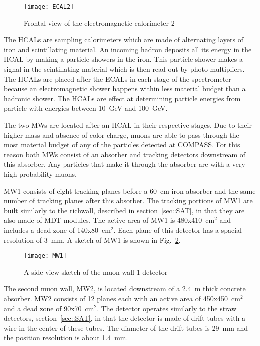 \begin{figure}[h!t]
  \centering
  \texttt{[image: ECAL2]}
  \caption{Frontal view of the electromagnetic calorimeter 2}
  \label{fig::ECAL2}
\end{figure}


The HCALs are sampling calorimeters which are made of alternating layers of iron
and scintillating material.  An incoming hadron deposits all its energy in the
HCAL by making a particle showers in the iron.  This particle shower makes a
signal in the scintillating material which is then read out by photo
multipliers.  The HCALs are placed after the ECALs in each stage of the
spectrometer because an electromagnetic shower happens within less material
budget than a hadronic shower.  The HCALs are effect at determining particle
energies from particle with energies between 10~GeV and 100~GeV. \par

The two MWs are located after an HCAL in their respective stages.  Due to their
higher mass and absence of color charge, muons are able to pass through the most
material budget of any of the particles detected at COMPASS.  For this reason
both MWs consist of an absorber and tracking detectors downstream of this
absorber.  Any particles that make it through the absorber are with a very high
probability muons. \par

MW1 consists of eight tracking planes before a 60~cm iron
absorber and the same number of tracking planes after this absorber.  The
tracking portions of MW1 are built similarly to the richwall, described in
section~\ref{sec::SAT}, in that they are also made of MDT modules.  The active
area of MW1 is 480x410~cm$^2$ and includes a dead zone of 140x80~cm$^2$.  Each
plane of this detector has a spacial resolution of 3~mm.  A sketch of MW1 is
shown in Fig.~\ref{fig::MW1}. \par

\begin{figure}[h!t]
  \centering
  \texttt{[image: MW1]}
  \caption{A side view sketch of the muon wall 1 detector}
  \label{fig::MW1}
\end{figure}

The second muon wall, MW2, is located downstream of a 2.4~m thick concrete
absorber.  MW2 consists of 12 planes each with an active area of 450x450~cm$^2$
and a dead zone of 90x70~cm$^2$.  The detector operates similarly to the straw
detectors, section~\ref{sec::SAT}, in that the detector is made of drift tubes
with a wire in the center of these tubes.  The diameter of the drift tubes is
29~mm and the position resolution is about 1.4~mm. \par

